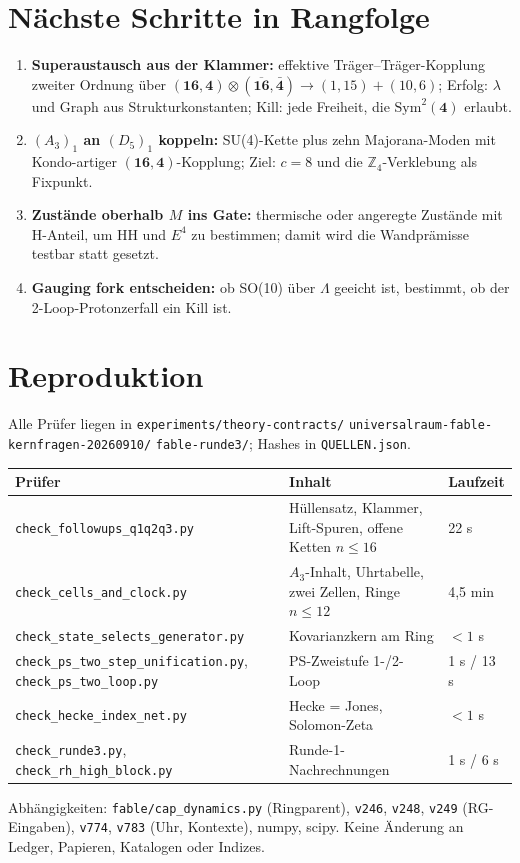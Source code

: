 \section{Nächste Schritte in Rangfolge}
\begin{enumerate}[leftmargin=*]
\item \textbf{Superaustausch aus der Klammer:} effektive Träger--Träger-Kopplung zweiter Ordnung über $(\mathbf{16},\mathbf 4)\otimes(\overline{\mathbf{16}},\bar{\mathbf 4})\to(1,15)+(10,6)$; Erfolg: $\lambda$ und Graph aus Strukturkonstanten; Kill: jede Freiheit, die $\mathrm{Sym}^2(\mathbf 4)$ erlaubt.
\item \textbf{$(A_3)_1$ an $(D_5)_1$ koppeln:} SU(4)-Kette plus zehn Majorana-Moden mit Kondo-artiger $(\mathbf{16},\mathbf 4)$-Kopplung; Ziel: $c=8$ und die $\mathbb Z_4$-Verklebung als Fixpunkt.
\item \textbf{Zustände oberhalb $M$ ins Gate:} thermische oder angeregte Zustände mit H-Anteil, um HH und $E^4$ zu bestimmen; damit wird die Wandprämisse testbar statt gesetzt.
\item \textbf{Gauging fork entscheiden:} ob SO(10) über $\Lambda$ geeicht ist, bestimmt, ob der 2-Loop-Protonzerfall ein Kill ist.
\end{enumerate}

\appendix
\section{Reproduktion}
Alle Prüfer liegen in \texttt{experiments/theory-contracts/} \texttt{universalraum-fable-kernfragen-20260910/} \texttt{fable-runde3/}; Hashes in \texttt{QUELLEN.json}.
\begin{center}\small
\begin{tabular}{@{}p{6.2cm}p{7.2cm}l@{}}\toprule
Prüfer & Inhalt & Laufzeit\\\midrule
\texttt{check\_followups\_q1q2q3.py} & Hüllensatz, Klammer, Lift-Spuren, offene Ketten $n\le16$ & 22 s\\
\texttt{check\_cells\_and\_clock.py} & $A_3$-Inhalt, Uhrtabelle, zwei Zellen, Ringe $n\le12$ & 4{,}5 min\\
\texttt{check\_state\_selects\_generator.py} & Kovarianzkern am Ring & $<1$ s\\
\texttt{check\_ps\_two\_step\_unification.py}, \newline\texttt{check\_ps\_two\_loop.py} & PS-Zweistufe 1-/2-Loop & 1 s / 13 s\\
\texttt{check\_hecke\_index\_net.py} & Hecke = Jones, Solomon-Zeta & $<1$ s\\
\texttt{check\_runde3.py}, \newline\texttt{check\_rh\_high\_block.py} & Runde-1-Nachrechnungen & 1 s / 6 s\\\bottomrule
\end{tabular}
\end{center}
Abhängigkeiten: \texttt{fable/cap\_dynamics.py} (Ringparent), \texttt{v246}, \texttt{v248}, \texttt{v249} (RG-Eingaben), \texttt{v774}, \texttt{v783} (Uhr, Kontexte), numpy, scipy. Keine Änderung an Ledger, Papieren, Katalogen oder Indizes.


